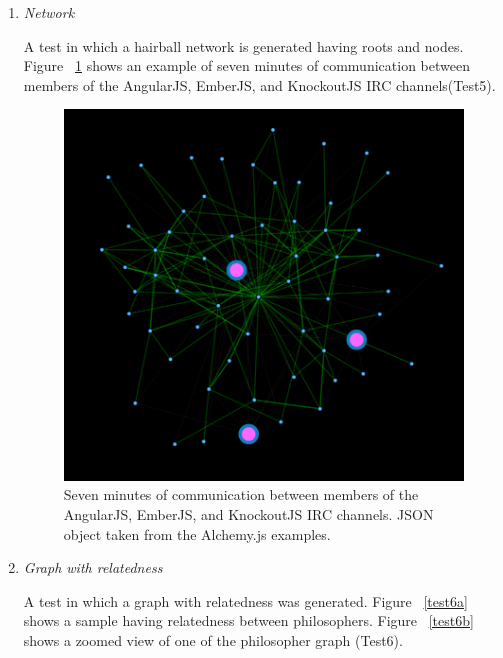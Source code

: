 \begin{enumerate}
\item \textit{Network}
\par A test in which a hairball network is generated having roots and nodes.  Figure ~\ref{test5} shows an example of seven minutes of communication between members of the AngularJS, EmberJS, and KnockoutJS IRC channels(Test5).

\begin{figure}[H]
\centering
\includegraphics[scale=0.3]{t4.png}
\caption{\label{test5} Seven minutes of communication between members of the AngularJS, EmberJS, and KnockoutJS IRC channels. JSON object taken from the Alchemy.js examples.}
\end{figure}

\item \textit{Graph with relatedness}
\par A test in which a graph with relatedness was generated. Figure ~\ref{test6a} shows a sample having relatedness between philosophers. Figure ~\ref{test6b} shows a zoomed view of one of the philosopher graph (Test6).


\end{enumerate}
